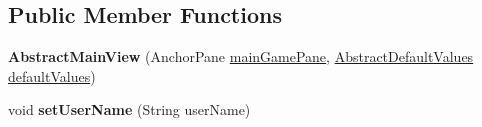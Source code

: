 \subsection*{Public Member Functions}
\begin{DoxyCompactItemize}
\item 
\hypertarget{classhu_1_1elte_1_1bfw1p6_1_1poker_1_1client_1_1view_1_1_abstract_main_view_a7049a6d1475c08b9a967d1adfe226a74}{}{\bfseries Abstract\+Main\+View} (Anchor\+Pane \hyperlink{classhu_1_1elte_1_1bfw1p6_1_1poker_1_1client_1_1view_1_1_abstract_main_view_ad9a49e46e49fe5dfb4c4847e961b31cf}{main\+Game\+Pane}, \hyperlink{classhu_1_1elte_1_1bfw1p6_1_1poker_1_1client_1_1defaultvalues_1_1_abstract_default_values}{Abstract\+Default\+Values} \hyperlink{classhu_1_1elte_1_1bfw1p6_1_1poker_1_1client_1_1view_1_1_abstract_main_view_aee1607b1e6452a46e111eb0e41d779cb}{default\+Values})\label{classhu_1_1elte_1_1bfw1p6_1_1poker_1_1client_1_1view_1_1_abstract_main_view_a7049a6d1475c08b9a967d1adfe226a74}

\item 
\hypertarget{classhu_1_1elte_1_1bfw1p6_1_1poker_1_1client_1_1view_1_1_abstract_main_view_a4ffc01d78b5c345c7c131464367c8f09}{}void {\bfseries set\+User\+Name} (String user\+Name)\label{classhu_1_1elte_1_1bfw1p6_1_1poker_1_1client_1_1view_1_1_abstract_main_view_a4ffc01d78b5c345c7c131464367c8f09}


\end{DoxyCompactItemize}
